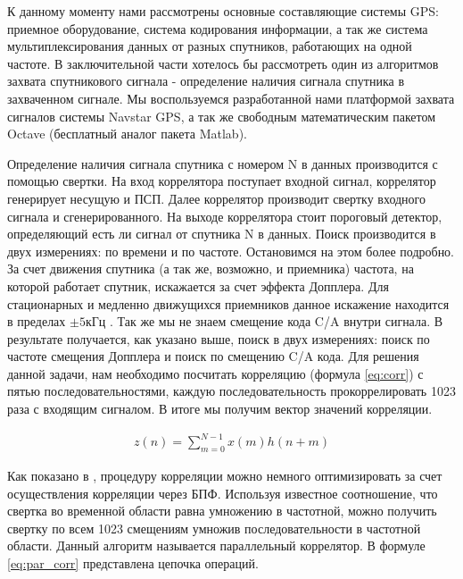 \documentclass[a4paper,12pt]{article}
\numberwithin{table}{section}
\begin{document}
К данному моменту нами рассмотрены основные составляющие системы GPS: приемное оборудование, система кодирования информации,
а так же система мультиплексирования данных от разных спутников, работающих на одной частоте. В заключительной части хотелось
бы рассмотреть один из алгоритмов захвата спутникового сигнала - определение наличия сигнала спутника 
в захваченном сигнале. Мы воспользуемся разработанной нами платформой захвата сигналов системы Navstar GPS, а так же
свободным математическим пакетом Octave (бесплатный аналог пакета Matlab).

Определение наличия сигнала спутника с номером N в данных производится с помощью свертки. На вход коррелятора поступает входной
сигнал, коррелятор генерирует несущую и ПСП. Далее коррелятор производит свертку входного сигнала и сгенерированного. 
На выходе коррелятора стоит пороговый детектор, определяющий есть ли сигнал от спутника N в данных. Поиск производится в 
двух измерениях: по времени и по частоте. Остановимся на этом более подробно. За счет движения спутника (а так же, возможно,
и приемника) частота, на которой работает спутник, искажается за счет эффекта Допплера. Для стационарных и медленно движущихся
приемников данное искажение находится в  пределах ${\pm{5 \mbox{кГц}}}$ \cite{tsui}. Так же мы не знаем смещение кода C/A
внутри сигнала. В результате получается, как указано выше, поиск в двух измерениях: поиск по частоте смещения Допплера и
поиск по смещению C/A кода. Для решения данной задачи, нам необходимо посчитать корреляцию (формула \ref{eq:corr}) с пятью последовательностями,
каждую последовательность прокоррелировать 1023 раза с входящим сигналом. В итоге мы получим вектор значений корреляции.

\begin{eqnarray}
	z(n) = \sum_{m=0}^{N-1}{x(m)h(n+m)}
\label{eq:corr}
\end{eqnarray}

Как показано в \cite{oppenheim, tsui}, процедуру корреляции можно немного оптимизировать за счет осуществления корреляции через
БПФ. Используя известное соотношение, что свертка во временной области равна умножению в частотной, можно получить свертку по
всем 1023 смещениям умножив последовательности в частотной области. Данный алгоритм называется параллельный коррелятор.
В формуле \ref{eq:par_corr} представлена цепочка операций.
\end{document}
